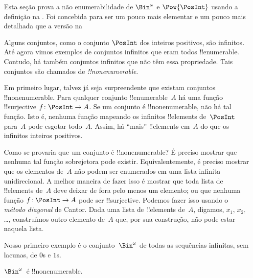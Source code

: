 \documentclass[../../../include/open-logic-section]{subfiles}
\begin{document}


\begin{editorial}
  Esta seção prova a não enumerabilidade de $\Bin^\omega$ e
  $\Pow{\PosInt}$ usando a definição na . Foi
  concebida para ser um pouco mais elementar e um pouco mais detalhada
  que a versão na 
\end{editorial}

Alguns conjuntos, como o conjunto $\PosInt$ dos inteiros positivos, são
infinitos. Até agora vimos exemplos de conjuntos infinitos que eram todos
!!{enumerable}. Contudo, há também conjuntos infinitos que não
têm essa propriedade. Tais conjuntos são chamados de \emph{!!{nonenumerable}}.

Em primeiro lugar, talvez já seja surpreendente que existam
conjuntos !!{nonenumerable}. Para qualquer conjunto !!{enumerable}~$A$ há
uma função !!{surjective} $f \colon \PosInt \to A$. Se um conjunto é
!!{nonenumerable}, não há tal função. Isto é, nenhuma função
mapeando os infinitos !!{element}s de~$\PosInt$ para~$A$ pode
esgotar todo~$A$. Assim, há ``mais'' !!{element}s em~$A$ do que
os infinitos inteiros positivos.

Como se provaria que um conjunto é !!{nonenumerable}? É preciso mostrar
que nenhuma tal função sobrejetora pode existir. Equivalentemente, é preciso
mostrar que os elementos de~$A$ não podem ser enumerados em uma lista
infinita unidirecional. A melhor maneira de fazer isso é mostrar que toda lista de
!!{element}s de~$A$ deve deixar de fora pelo menos um elemento; ou que nenhuma
função $f\colon \PosInt \to A$ pode ser !!{surjective}. Podemos fazer isso
usando o \emph{método diagonal} de Cantor. Dada uma lista de !!{element}s
de~$A$, digamos, $x_1$, $x_2$, \dots, construímos outro elemento de~$A$
que, por sua construção, não pode estar naquela lista.

Nosso primeiro exemplo é o conjunto~$\Bin^\omega$ de todas as sequências infinitas, sem lacunas,
de $0$s e $1$s.

\begin{thm}
$\Bin^\omega$~é !!{nonenumerable}.
\end{thm}
\end{document}
